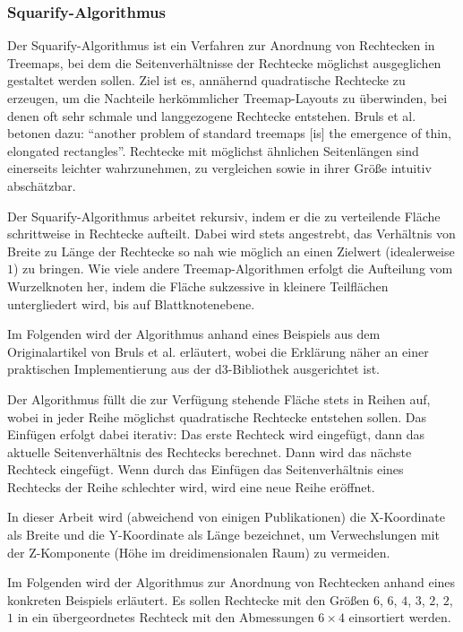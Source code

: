 \subsubsection{Squarify-Algorithmus} \label{sec:Squarify}

Der Squarify-Algorithmus ist ein Verfahren zur Anordnung von Rechtecken in Treemaps, bei dem die Seitenverhältnisse der Rechtecke möglichst ausgeglichen gestaltet werden sollen. Ziel ist es, annähernd quadratische Rechtecke zu erzeugen, um die Nachteile herkömmlicher Treemap-Layouts zu überwinden, bei denen oft sehr schmale und langgezogene Rechtecke entstehen. Bruls et al. betonen dazu: 
\enquote{another problem of standard treemaps [is] the emergence of thin, elongated rectangles}\cite[1]{bruls2000squarified}. Rechtecke mit möglichst ähnlichen Seitenlängen sind einerseits leichter wahrzunehmen, zu vergleichen sowie in ihrer Größe intuitiv abschätzbar.

Der Squarify-Algorithmus arbeitet rekursiv, indem er die zu verteilende Fläche schrittweise in Rechtecke aufteilt. Dabei wird stets angestrebt, das Verhältnis von Breite zu Länge der Rechtecke so nah wie möglich an einen Zielwert (idealerweise $1$) zu bringen. Wie viele andere Treemap-Algorithmen erfolgt die Aufteilung vom Wurzelknoten her, indem die Fläche sukzessive in kleinere Teilflächen untergliedert wird, bis auf Blattknotenebene.

Im Folgenden wird der Algorithmus anhand eines Beispiels aus dem Originalartikel von Bruls et al. \cite[5]{bruls2000squarified} erläutert, wobei die Erklärung näher an einer praktischen Implementierung aus der d3-Bibliothek \cite{d3_treemap_code} ausgerichtet ist.

Der Algorithmus füllt die zur Verfügung stehende Fläche stets in Reihen auf, wobei in jeder Reihe möglichst quadratische Rechtecke entstehen sollen. Das Einfügen erfolgt dabei iterativ: Das erste Rechteck wird eingefügt, dann das aktuelle Seitenverhältnis des Rechtecks berechnet. Dann wird das nächste Rechteck eingefügt. Wenn durch das Einfügen das Seitenverhältnis eines Rechtecks der Reihe schlechter wird, wird eine neue Reihe eröffnet.

In dieser Arbeit wird (abweichend von einigen Publikationen) die X-Koordinate als Breite und die Y-Koordinate als Länge bezeichnet, um Verwechslungen mit der Z-Komponente (Höhe im dreidimensionalen Raum) zu vermeiden.

\smallskip

Im Folgenden wird der Algorithmus zur Anordnung von Rechtecken anhand eines konkreten Beispiels erläutert. Es sollen Rechtecke mit den Größen $6$, $6$, $4$, $3$, $2$, $2$, $1$ in ein übergeordnetes Rechteck mit den Abmessungen $6 \times 4$ einsortiert werden. 

